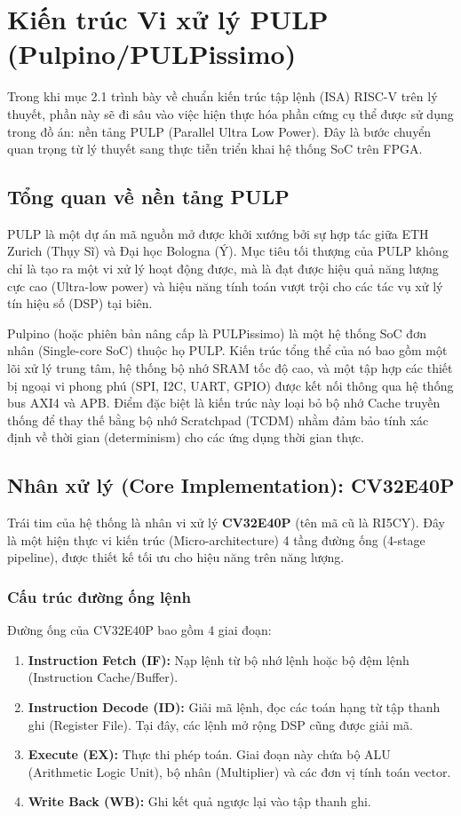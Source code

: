 %
\section{Kiến trúc Vi xử lý PULP (Pulpino/PULPissimo)}

Trong khi mục 2.1 trình bày về chuẩn kiến trúc tập lệnh (ISA) RISC-V trên lý thuyết, phần này sẽ đi sâu vào việc hiện thực hóa phần cứng cụ thể được sử dụng trong đồ án: nền tảng PULP (Parallel Ultra Low Power). Đây là bước chuyển quan trọng từ lý thuyết sang thực tiễn triển khai hệ thống SoC trên FPGA.

\subsection{Tổng quan về nền tảng PULP}
PULP là một dự án mã nguồn mở được khởi xướng bởi sự hợp tác giữa ETH Zurich (Thụy Sĩ) và Đại học Bologna (Ý). Mục tiêu tối thượng của PULP không chỉ là tạo ra một vi xử lý hoạt động được, mà là đạt được hiệu quả năng lượng cực cao (Ultra-low power) và hiệu năng tính toán vượt trội cho các tác vụ xử lý tín hiệu số (DSP) tại biên.

Pulpino (hoặc phiên bản nâng cấp là PULPissimo) là một hệ thống SoC đơn nhân (Single-core SoC) thuộc họ PULP. Kiến trúc tổng thể của nó bao gồm một lõi xử lý trung tâm, hệ thống bộ nhớ SRAM tốc độ cao, và một tập hợp các thiết bị ngoại vi phong phú (SPI, I2C, UART, GPIO) được kết nối thông qua hệ thống bus AXI4 và APB. Điểm đặc biệt là kiến trúc này loại bỏ bộ nhớ Cache truyền thống để thay thế bằng bộ nhớ Scratchpad (TCDM) nhằm đảm bảo tính xác định về thời gian (determinism) cho các ứng dụng thời gian thực.

\subsection{Nhân xử lý (Core Implementation): CV32E40P}
Trái tim của hệ thống là nhân vi xử lý \textbf{CV32E40P} (tên mã cũ là RI5CY). Đây là một hiện thực vi kiến trúc (Micro-architecture) 4 tầng đường ống (4-stage pipeline), được thiết kế tối ưu cho hiệu năng trên năng lượng.

\subsubsection{Cấu trúc đường ống lệnh}
Đường ống của CV32E40P bao gồm 4 giai đoạn:
\begin{enumerate}
    \item \textbf{Instruction Fetch (IF):} Nạp lệnh từ bộ nhớ lệnh hoặc bộ đệm lệnh (Instruction Cache/Buffer).
    \item \textbf{Instruction Decode (ID):} Giải mã lệnh, đọc các toán hạng từ tập thanh ghi (Register File). Tại đây, các lệnh mở rộng DSP cũng được giải mã.
    \item \textbf{Execute (EX):} Thực thi phép toán. Giai đoạn này chứa bộ ALU (Arithmetic Logic Unit), bộ nhân (Multiplier) và các đơn vị tính toán vector.
    \item \textbf{Write Back (WB):} Ghi kết quả ngược lại vào tập thanh ghi.
\end{enumerate}

